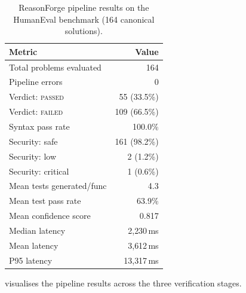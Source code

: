 \documentclass[11pt,a4paper]{article}
\begin{document}
\begin{table}[h]
\centering
\small
\begin{tabular}{@{}lr@{}}
\toprule
\textbf{Metric} & \textbf{Value} \\
\midrule
Total problems evaluated  & 164 \\
Pipeline errors           & 0 \\
Verdict: \textsc{passed}  & 55 (33.5\%) \\
Verdict: \textsc{failed}  & 109 (66.5\%) \\
Syntax pass rate          & 100.0\% \\
Security: safe            & 161 (98.2\%) \\
Security: low             & 2 (1.2\%) \\
Security: critical        & 1 (0.6\%) \\
Mean tests generated/func & 4.3 \\
Mean test pass rate       & 63.9\% \\
Mean confidence score     & 0.817 \\
\midrule
Median latency            & 2{,}230\,ms \\
Mean latency              & 3{,}612\,ms \\
P95 latency               & 13{,}317\,ms \\
\bottomrule
\end{tabular}
\caption{ReasonForge pipeline results on the HumanEval benchmark
  (164 canonical solutions).}
\label{tab:humaneval}
\end{table}

 visualises the pipeline results across the three
verification stages.
\end{document}
